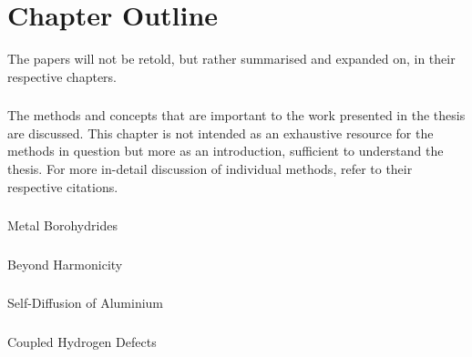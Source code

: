 \section{Chapter Outline}
\label{sec:chapters}

The papers will not be retold, but rather summarised and expanded on, in their respective chapters.

\subsubsection{}
The methods and concepts that are important to the work presented in the thesis are discussed.
This chapter is not intended as an exhaustive resource for the methods in question but more as an introduction, sufficient to understand the thesis.
For more in-detail discussion of individual methods, refer to their respective citations.

\subsubsection{}
Metal Borohydrides \expand

\subsubsection{}
Beyond Harmonicity \expand

\subsubsection{}
Self-Diffusion of Aluminium \expand

\subsubsection{}
Coupled Hydrogen Defects \expand

